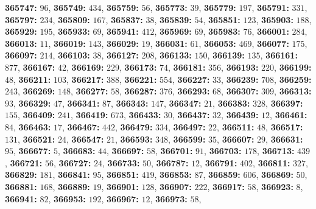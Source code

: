 \textsf{\bfseries 365747:} $96$, \textsf{\bfseries 365749:} $434$, \textsf{\bfseries 365759:} $56$, \textsf{\bfseries 365773:} $39$, \textsf{\bfseries 365779:} $197$, \textsf{\bfseries 365791:} $331$, \textsf{\bfseries 365797:} $234$, \textsf{\bfseries 365809:} $167$, \textsf{\bfseries 365837:} $38$, \textsf{\bfseries 365839:} $54$, \textsf{\bfseries 365851:} $123$, \textsf{\bfseries 365903:} $188$, \textsf{\bfseries 365929:} $195$, \textsf{\bfseries 365933:} $69$, \textsf{\bfseries 365941:} $412$, \textsf{\bfseries 365969:} $69$, \textsf{\bfseries 365983:} $76$, \textsf{\bfseries 366001:} $284$, \textsf{\bfseries 366013:} $11$, \textsf{\bfseries 366019:} $143$, \textsf{\bfseries 366029:} $19$, \textsf{\bfseries 366031:} $61$, \textsf{\bfseries 366053:} $469$, \textsf{\bfseries 366077:} $175$, \textsf{\bfseries 366097:} $214$, \textsf{\bfseries 366103:} $38$, \textsf{\bfseries 366127:} $208$, \textsf{\bfseries 366133:} $150$, \textsf{\bfseries 366139:} $135$, \textsf{\bfseries 366161:} $877$, \textsf{\bfseries 366167:} $42$, \textsf{\bfseries 366169:} $229$, \textsf{\bfseries 366173:} $74$, \textsf{\bfseries 366181:} $356$, \textsf{\bfseries 366193:} $220$, \textsf{\bfseries 366199:} $48$, \textsf{\bfseries 366211:} $103$, \textsf{\bfseries 366217:} $388$, \textsf{\bfseries 366221:} $554$, \textsf{\bfseries 366227:} $33$, \textsf{\bfseries 366239:} $708$, \textsf{\bfseries 366259:} $243$, \textsf{\bfseries 366269:} $148$, \textsf{\bfseries 366277:} $58$, \textsf{\bfseries 366287:} $376$, \textsf{\bfseries 366293:} $68$, \textsf{\bfseries 366307:} $309$, \textsf{\bfseries 366313:} $93$, \textsf{\bfseries 366329:} $47$, \textsf{\bfseries 366341:} $87$, \textsf{\bfseries 366343:} $147$, \textsf{\bfseries 366347:} $21$, \textsf{\bfseries 366383:} $328$, \textsf{\bfseries 366397:} $155$, \textsf{\bfseries 366409:} $241$, \textsf{\bfseries 366419:} $673$, \textsf{\bfseries 366433:} $30$, \textsf{\bfseries 366437:} $32$, \textsf{\bfseries 366439:} $12$, \textsf{\bfseries 366461:} $84$, \textsf{\bfseries 366463:} $17$, \textsf{\bfseries 366467:} $442$, \textsf{\bfseries 366479:} $334$, \textsf{\bfseries 366497:} $22$, \textsf{\bfseries 366511:} $48$, \textsf{\bfseries 366517:} $131$, \textsf{\bfseries 366521:} $24$, \textsf{\bfseries 366547:} $21$, \textsf{\bfseries 366593:} $348$, \textsf{\bfseries 366599:} $35$, \textsf{\bfseries 366607:} $29$, \textsf{\bfseries 366631:} $95$, \textsf{\bfseries 366677:} $5$, \textsf{\bfseries 366683:} $44$, \textsf{\bfseries 366697:} $58$, \textsf{\bfseries 366701:} $91$, \textsf{\bfseries 366703:} $178$, \textsf{\bfseries 366713:} $439$, \textsf{\bfseries 366721:} $56$, \textsf{\bfseries 366727:} $24$, \textsf{\bfseries 366733:} $50$, \textsf{\bfseries 366787:} $12$, \textsf{\bfseries 366791:} $402$, \textsf{\bfseries 366811:} $327$, \textsf{\bfseries 366829:} $181$, \textsf{\bfseries 366841:} $95$, \textsf{\bfseries 366851:} $419$, \textsf{\bfseries 366853:} $87$, \textsf{\bfseries 366859:} $606$, \textsf{\bfseries 366869:} $50$, \textsf{\bfseries 366881:} $168$, \textsf{\bfseries 366889:} $19$, \textsf{\bfseries 366901:} $128$, \textsf{\bfseries 366907:} $222$, \textsf{\bfseries 366917:} $58$, \textsf{\bfseries 366923:} $8$, \textsf{\bfseries 366941:} $82$, \textsf{\bfseries 366953:} $192$, \textsf{\bfseries 366967:} $12$, \textsf{\bfseries 366973:} $58$, 
